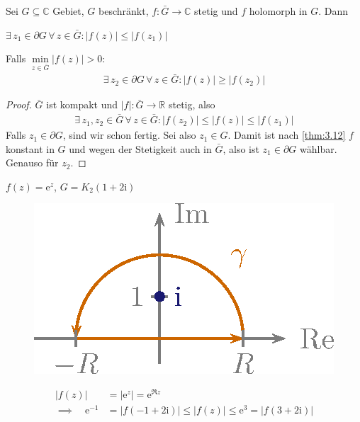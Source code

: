 \documentclass[a4paper,10pt]{scrbook}
\begin{document}
\begin{theorem}[Maximumprinzip II] \label{thm:3.13}
  Sei $G \subseteq \mathbb{C}$ Gebiet, $G$ beschränkt, $f : \bar{G} \to \mathbb{C}$ stetig und $f$ holomorph in $G$. Dann
  \begin{enum-arab}
    \item $\exists \, z_1 \in \partial G \, \forall \, z \in \bar{G} : |f(z)| \leq |f(z_1)|$

    \item Falls $\min\limits_{z \in \bar{G}} |f(z)| > 0$:
    \begin{align*}
      \exists \, z_2 \in \partial G \, \forall \, z \in \bar{G}: |f(z)| \geq |f(z_2)|
    \end{align*}
  \end{enum-arab}

  \begin{proof}
    $\bar{G}$ ist kompakt und $|f| : \bar{G} \to \mathbb{R}$ stetig, also
    \begin{align*}
      \exists \, z_1,z_2 \in \bar{G} \, \forall \, z \in \bar{G} : |f(z_2)| \leq |f(z)| \leq |f(z_1)|
    \end{align*}
    Falls $z_1 \in \partial G$, sind wir schon fertig.
    Sei also $z_1 \in G$.
    Damit ist nach \ref{thm:3.12} $f$ konstant in $G$ und wegen der Stetigkeit auch in $\bar{G}$, also ist $z_1 \in \partial G$ wählbar. Genauso für $z_2$.
  \end{proof}
\end{theorem}

\begin{example}
  $f(z) = \mathrm{e}^z$, $G = K_2(1 + 2 \mathrm{i})$
  \begin{figure}[H]
    \centering
    \includegraphics[scale=0.2]{images/ana3-tmp-28}
    \vspace*{-4em}
  \end{figure}
  \begin{align*}
    |f(z)| &= |\mathrm{e}^z| = \mathrm{e}^{\Re z} \\
    \implies \quad \mathrm{e}^{-1} &= |f(-1+2\mathrm{i})| \leq |f(z)| \leq \mathrm{e}^3 = |f(3+2\mathrm{i})|
  \end{align*}
\end{example}
\end{document}

